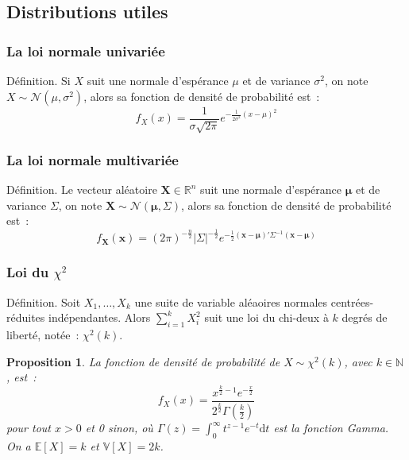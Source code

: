 \documentclass[10pt]{beamer}
\theoremstyle{plain}
\newenvironment{defn}[1]
{\bgroup \small\begin{block}{Définition. #1}}
  {\end{block}\egroup}
\newtheorem{prop}{Proposition}
\begin{document}
\subsection{Distributions utiles}

\begin{frame}
  \frametitle{La loi normale univariée}

  \begin{defn}{}
    Si $X$ suit une normale d'espérance $\mu$ et de variance $\sigma^2$, on note $X\sim\mathcal N \left(\mu, \sigma^2\right)$, alors sa fonction de densité de probabilité est~:
    \[
      f_X(x) = \frac{1}{\sigma\sqrt{2\pi}}e^{-\frac{1}{2\sigma^2}\left(x-\mu\right)^2}
    \]
  \end{defn}

\end{frame}

\begin{frame}
  \frametitle{La loi normale multivariée}

  \begin{defn}{}
    Le vecteur aléatoire $\bm{X}\in \mathbb R^n$ suit une normale d'espérance $\bm \mu$ et de variance $\Sigma$, on note $\bm{X}\sim\mathcal N \left(\bm\mu, \Sigma\right)$, alors sa fonction de densité de probabilité est~:
    \[
      f_{\bm X}(\bm x) = \left( 2\pi \right)^{-\frac{n}{2}}\left| \Sigma \right|^{-\frac{1}{2}}e^{-\frac{1}{2}\left(\bm x-\bm\mu\right)'\Sigma^{-1}\left(\bm x-\bm\mu\right)}
    \]
  \end{defn}

\end{frame}


\begin{frame}
  \frametitle{Loi du $\chi^2$}

  \begin{defn}{}
    Soit $X_1, \dots, X_k$ une suite de variable aléaoires normales centrées-réduites indépendantes. Alors $\sum_{i=1}^kX_i^2$ suit une loi du chi-deux à $k$ degrés de liberté, notée~: $\chi^2(k)$.
  \end{defn}

  \bigskip

  \begin{prop}\label{prop:chi2}
    La fonction de densité de probabilité de $X\sim\chi^2(k)$,
    avec $k\in\mathbb N$, est~:
    \[
      f_X(x) = \frac{x^{\frac{k}{2}-1}e^{-\frac{x}{2}}}{2^{\frac{k}{2}}\Gamma\left(\frac{k}{2}\right)}
    \]
    pour tout $x>0$ et 0 sinon, où $\Gamma(z) = \int_0^{\infty}t^{z-1}e^{-t}\mathrm dt$ est la
    fonction Gamma. On a $\mathbb E\left[ X \right]=k$ et $\mathbb V\left[ X \right] = 2k$.
  \end{prop}

\end{frame}
\end{document}
